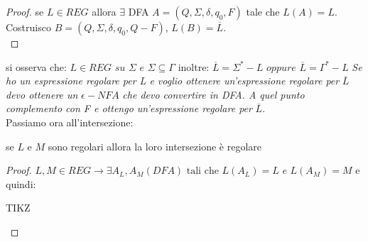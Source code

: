 \begin{proof}
	se $L\in REG$ allora $\exists$ DFA $A=(Q, \Sigma, \delta, q_0, F)$ tale che $L(A)=L$. Costruisco $B=(Q,\Sigma, \delta,q_0, Q-F),\,	 L(B)=\overline{L}$.\\
\end{proof}
si osserva che:
$L\in REG\,\,su\,\, \Sigma\,\,e\,\, \Sigma\subseteq \Gamma$
inoltre:
$\overline{L}=\Sigma^*-L\,\,oppure\,\, \overline{L}=\Gamma^*-L$
\textit{Se ho un espressione regolare per L e voglio ottenere un'espressione regolare per }$\overline{L}$\textit{ devo ottenere un }$\epsilon-NFA$\textit{ che devo convertire in DFA. A quel punto complemento con F e ottengo un'espressione regolare per }$\overline{L}$.\\
Passiamo ora all'intersezione:
\begin{theorem}
	se $L$ e $M$ sono regolari allora la loro intersezione è regolare
\end{theorem}
\begin{proof}
	$L,M\in REG\to \exists A_L,A_M(DFA) \text{ tali che }L(A_L)=L\,\,e\,\, L(A_M)=M$
	e quindi:
	\begin{center}
		TIKZ
	\end{center}
\end{proof}
